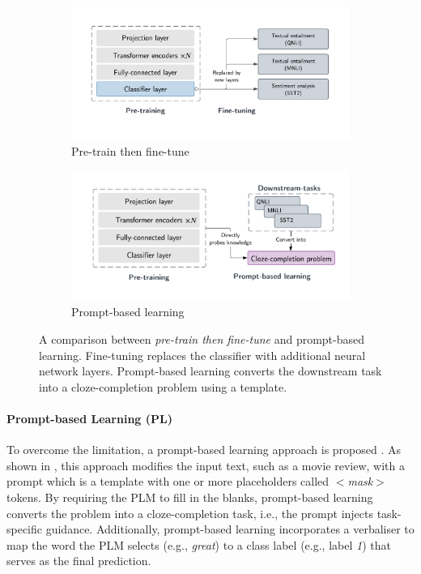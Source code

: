 \vspace{-1.0em}
\begin{figure}[!ht]
\begin{subfigure}{.5\textwidth}
  \centering
  \includegraphics[width=\linewidth]{figures/introduction_media/intro-compare-pf.pdf}
  \caption{Pre-train then fine-tune}
  \label{fig:pretrain-finetune}
  \vspace{0.2em}
\end{subfigure}%
\begin{subfigure}{.5\textwidth}
  \centering
  \includegraphics[width=\linewidth]{figures/introduction_media/intro-compare-pl.pdf}
  \caption{Prompt-based learning}
  \label{fig:prompt-learning}
  \vspace{0.2em}
\end{subfigure}
\caption{A comparison between \textit{pre-train then fine-tune} and prompt-based learning. Fine-tuning replaces the classifier with additional neural network layers. Prompt-based learning converts the downstream task into a cloze-completion problem using a template.}
\label{fig:intro-compare}
\end{figure}

\vspace{-1.5em}
\paragraph{Prompt-based Learning (PL)} To overcome the limitation, a prompt-based learning approach is proposed \cite{Liu21}. As shown in , this approach modifies the input text, such as a movie review, with a prompt which is a template with one or more placeholders called $<$\textit{mask}$>$ tokens. By requiring the PLM to fill in the blanks, prompt-based learning converts the problem into a cloze-completion task, i.e., the prompt injects task-specific guidance. Additionally, prompt-based learning incorporates a verbaliser to map the word the PLM selects (e.g., \textit{great}) to a class label (e.g., label \textit{1}) that serves as the final prediction.

